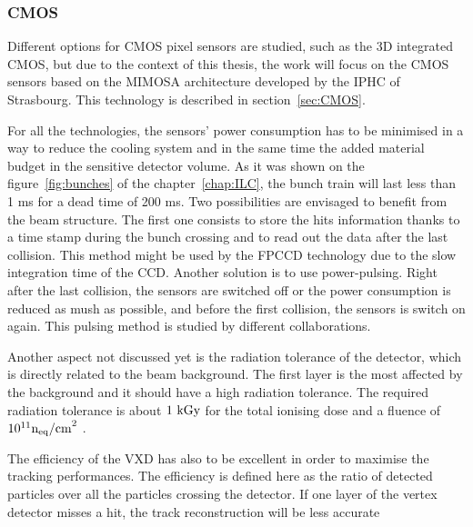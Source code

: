 
   \subsubsection{CMOS}

   Different options for \gls{CMOS} pixel sensors are studied, such as the 3D integrated \gls{CMOS}, but due to the context of this thesis, the work will focus on the \gls{CMOS} sensors based on the \gls{MIMOSA} architecture developed by the IPHC of Strasbourg. 
   This technology is described in section~\ref{sec:CMOS}.

   For all the technologies, the sensors' power consumption has to be minimised in a way to reduce the cooling system and in the same time the added material budget in the sensitive detector volume.
   As it was shown on the figure~\ref{fig:bunches} of the chapter~\ref{chap:ILC}, the bunch train will last less than 1 ms for a dead time of 200 ms.
   Two possibilities are envisaged to benefit from the beam structure.
   The first one consists to store the hits information thanks to a time stamp during the bunch crossing and to read out the data after the last collision.
   This method might be used by the \gls{FPCCD} technology due to the slow integration time of the \gls{CCD}.
   Another solution is to use power-pulsing.
   Right after the last collision, the sensors are switched off or the power consumption is reduced as mush as possible, and before the first collision, the sensors is switch on again.
   This pulsing method is studied by different collaborations. 
   
   Another aspect not discussed yet is the radiation tolerance of the detector, which is directly related to the beam background.
   The first layer is the most affected by the background and it should have a high radiation tolerance. 
   The required radiation tolerance is about $1~\rm{kGy}$ for the total ionising dose and a fluence of $10^{11}\rm{n}_{\rm{eq}}\rm{/cm}^2$ \cite{Behnke2013}.

   The efficiency of the \gls{VXD} has also to be excellent in order to maximise the tracking performances.
   The efficiency is defined here as the ratio of detected particles over all the particles crossing the detector.
   If one layer of the vertex detector misses a hit, the track reconstruction will be less accurate 
   
